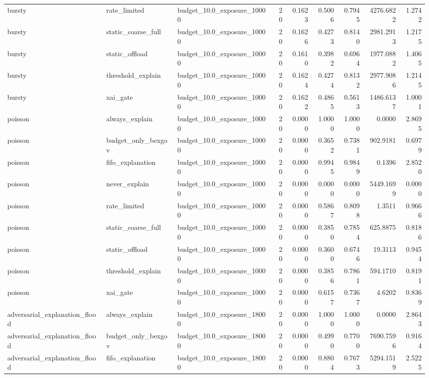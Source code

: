 \begin{table}[t]
\begin{tabular}{lllrrrrrr}
bursty & rate\_limited & budget\_10.0\_exposure\_10000 & 20 & 0.1623 & 0.5006 & 0.7945 & 4276.6822 & 1.2742 \\
bursty & static\_coarse\_full & budget\_10.0\_exposure\_10000 & 20 & 0.1626 & 0.4273 & 0.8140 & 2981.2913 & 1.2175 \\
bursty & static\_offload & budget\_10.0\_exposure\_10000 & 20 & 0.1610 & 0.3982 & 0.6964 & 1977.0882 & 1.4065 \\
bursty & threshold\_explain & budget\_10.0\_exposure\_10000 & 20 & 0.1624 & 0.4274 & 0.8132 & 2977.9086 & 1.2145 \\
bursty & xai\_gate & budget\_10.0\_exposure\_10000 & 20 & 0.1622 & 0.4865 & 0.5613 & 1486.6137 & 1.0001 \\
poisson & always\_explain & budget\_10.0\_exposure\_10000 & 20 & 0.0000 & 1.0000 & 1.0000 & 0.0000 & 2.8695 \\
poisson & budget\_only\_bexgov & budget\_10.0\_exposure\_10000 & 20 & 0.0000 & 0.3652 & 0.7381 & 902.9181 & 0.6979 \\
poisson & fifo\_explanation & budget\_10.0\_exposure\_10000 & 20 & 0.0000 & 0.9945 & 0.9849 & 0.1396 & 2.8520 \\
poisson & never\_explain & budget\_10.0\_exposure\_10000 & 20 & 0.0000 & 0.0000 & 0.0000 & 5449.1699 & 0.0000 \\
poisson & rate\_limited & budget\_10.0\_exposure\_10000 & 20 & 0.0000 & 0.5867 & 0.8098 & 1.3511 & 0.9666 \\
poisson & static\_coarse\_full & budget\_10.0\_exposure\_10000 & 20 & 0.0000 & 0.3850 & 0.7854 & 625.8875 & 0.8186 \\
poisson & static\_offload & budget\_10.0\_exposure\_10000 & 20 & 0.0000 & 0.3600 & 0.6746 & 19.3113 & 0.9454 \\
poisson & threshold\_explain & budget\_10.0\_exposure\_10000 & 20 & 0.0000 & 0.3856 & 0.7861 & 594.1710 & 0.8191 \\
poisson & xai\_gate & budget\_10.0\_exposure\_10000 & 20 & 0.0000 & 0.6157 & 0.7367 & 4.6202 & 0.8369 \\
adversarial\_explanation\_flood & always\_explain & budget\_10.0\_exposure\_18000 & 20 & 0.0000 & 1.0000 & 1.0000 & 0.0000 & 2.8643 \\
adversarial\_explanation\_flood & budget\_only\_bexgov & budget\_10.0\_exposure\_18000 & 20 & 0.0000 & 0.4990 & 0.7700 & 7690.7596 & 0.9164 \\
adversarial\_explanation\_flood & fifo\_explanation & budget\_10.0\_exposure\_18000 & 20 & 0.0000 & 0.8804 & 0.7673 & 5294.1519 & 2.5225 \\

\end{tabular}
\end{table}
